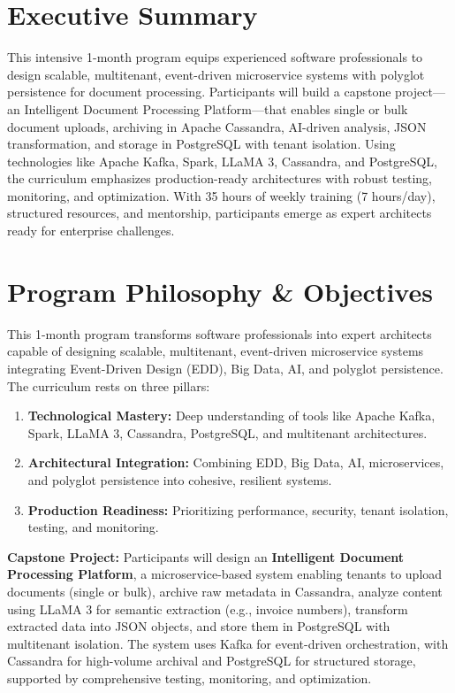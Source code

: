 \documentclass[11pt]{article}
\begin{document}
\section*{Executive Summary}
This intensive 1-month program equips experienced software professionals to design scalable, multitenant, event-driven microservice systems with polyglot persistence for document processing. Participants will build a capstone project—an Intelligent Document Processing Platform—that enables single or bulk document uploads, archiving in Apache Cassandra, AI-driven analysis, JSON transformation, and storage in PostgreSQL with tenant isolation. Using technologies like Apache Kafka, Spark, LLaMA 3, Cassandra, and PostgreSQL, the curriculum emphasizes production-ready architectures with robust testing, monitoring, and optimization. With 35 hours of weekly training (7 hours/day), structured resources, and mentorship, participants emerge as expert architects ready for enterprise challenges.

\tableofcontents
\newpage

\section{Program Philosophy \& Objectives}
This 1-month program transforms software professionals into expert architects capable of designing scalable, multitenant, event-driven microservice systems integrating Event-Driven Design (EDD), Big Data, AI, and polyglot persistence. The curriculum rests on three pillars:
\begin{enumerate}
    \item \textbf{Technological Mastery:} Deep understanding of tools like Apache Kafka, Spark, LLaMA 3, Cassandra, PostgreSQL, and multitenant architectures.
    \item \textbf{Architectural Integration:} Combining EDD, Big Data, AI, microservices, and polyglot persistence into cohesive, resilient systems.
    \item \textbf{Production Readiness:} Prioritizing performance, security, tenant isolation, testing, and monitoring.
\end{enumerate}

\textbf{Capstone Project:} Participants will design an \textbf{Intelligent Document Processing Platform}, a microservice-based system enabling tenants to upload documents (single or bulk), archive raw metadata in Cassandra, analyze content using LLaMA 3 for semantic extraction (e.g., invoice numbers), transform extracted data into JSON objects, and store them in PostgreSQL with multitenant isolation. The system uses Kafka for event-driven orchestration, with Cassandra for high-volume archival and PostgreSQL for structured storage, supported by comprehensive testing, monitoring, and optimization.
\end{document}

